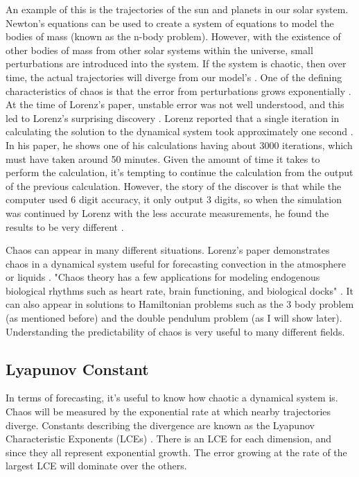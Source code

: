 \documentclass{article}
\begin{document}
An example of this is the trajectories of the sun and planets in our solar
system. Newton's equations can be used to create a system of equations to
model the bodies of mass (known as the n-body problem). However, with the
existence of other bodies of mass from other solar systems within the
universe, small perturbations are introduced into the system. If the system
is chaotic, then over time, the actual trajectories will diverge from our
model's \cite{oestreicher2007history}.
One of the defining characteristics of chaos is that the error from
perturbations grows exponentially \cite{oestreicher2007history}. At the time
of Lorenz's paper, unstable error was not well understood, and this led to
Lorenz's surprising discovery \cite{oestreicher2007history}. Lorenz reported
that a single iteration in calculating the solution to the dynamical system
took approximately one second \cite{lorenz1963deterministic}. In his paper,
he shows one of his calculations having about 3000 iterations, which must
have taken around 50 minutes. Given the amount of time it takes to perform
the calculation, it's tempting to continue the calculation from the output of
the previous calculation. However, the story of the discover is that while
the computer used 6 digit accuracy, it only output 3 digits, so when the
simulation was continued by Lorenz with the less accurate measurements, he
found the results to be very different \cite{oestreicher2007history}.

Chaos can appear in many different situations. Lorenz's paper demonstrates
chaos in a dynamical system useful for forecasting convection in the
atmosphere or liquids \cite{lorenz1963deterministic}. "Chaos theory has a few
applications for modeling endogenous biological rhythms such as heart rate,
brain functioning, and biological docks" \cite{oestreicher2007history}. It
can also appear in solutions to Hamiltonian problems such as the 3 body
problem (as mentioned before) and the double pendulum problem (as I will show
later). Understanding the predictability of chaos is very useful to many
different fields.

\subsection{Lyapunov Constant}

In terms of forecasting, it's useful to know how chaotic a dynamical system
is. Chaos will be measured by the exponential rate at which nearby
trajectories diverge. Constants describing the divergence are known as the
Lyapunov Characteristic Exponents (LCEs) \cite{sandri1996numerical}. There is
an LCE for each dimension, and since they all represent exponential growth.
The error growing at the rate of the largest LCE will dominate over the
others.
\end{document}
